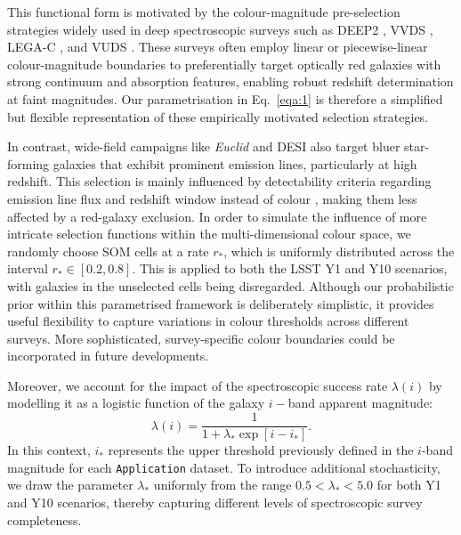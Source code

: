 This functional form is motivated by the colour-magnitude pre-selection strategies widely used in deep spectroscopic surveys such as DEEP2 \citep{2013ApJS..208....5N}, VVDS \citep{2005A&A...439..845L}, LEGA-C \citep{2021ApJS..256...44V}, and VUDS \citep{2015A&A...576A..79L}. These surveys often employ linear or piecewise-linear colour-magnitude boundaries to preferentially target optically red galaxies with strong continuum and absorption features, enabling robust redshift determination at faint magnitudes. Our parametrisation in Eq.~\ref{eqa:1} is therefore a simplified but flexible representation of these empirically motivated selection strategies.

In contrast, wide-field campaigns like \textit{Euclid} and DESI also target bluer star-forming galaxies that exhibit prominent emission lines, particularly at high redshift. This selection is mainly influenced by detectability criteria regarding emission line flux and redshift window instead of colour \citep{2024A&A...689A.166C, 2023AJ....165..126R}, making them less affected by a red-galaxy exclusion. In order to simulate the influence of more intricate selection functions within the multi-dimensional colour space, we randomly choose SOM cells at a rate \(r_\ast\), which is uniformly distributed across the interval \(r_\ast \in \left[0.2, 0.8\right]\). This is applied to both the LSST Y1 and Y10 scenarios, with galaxies in the unselected cells being disregarded. Although our probabilistic prior within this parametrised framework is deliberately simplistic, it provides useful flexibility to capture variations in colour thresholds across different surveys. More sophisticated, survey‐specific colour boundaries could be incorporated in future developments.

Moreover, we account for the impact of the spectroscopic success rate \(\lambda (i)\) by modelling it as a logistic function of the galaxy \(i-\)band apparent magnitude: 
\begin{equation} \label{eqa:2}
    \lambda (i) = \frac{1}{1 + \lambda_\ast \exp{\left[ i - i_\ast \right]}}.
\end{equation} 
In this context, \(i_\ast\) represents the upper threshold previously defined in the \(i\)-band magnitude for each \texttt{Application} dataset. To introduce additional stochasticity, we draw the parameter \(\lambda_\ast\) uniformly from the range \(0.5 < \lambda_\ast < 5.0\) for both Y1 and Y10 scenarios, thereby capturing different levels of spectroscopic survey completeness. 

